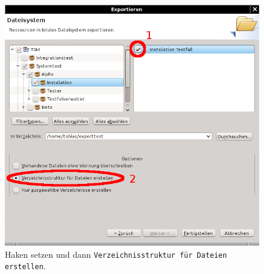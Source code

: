 \documentclass[11pt,a4paper,titlepage]{article}
\begin{document}
\begin{figure}[H]
 \centering
 \includegraphics{./ImportierenExportieren/assistent-exp2.png}
 \caption{Haken setzen und dann \texttt{Verzeichnisstruktur für Dateien erstellen}.}
 \label{abb:Assistent-exp2}
\end{figure}
\end{document}
